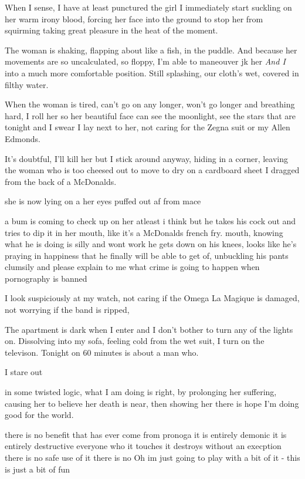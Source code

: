 \documentclass[19pt,openany]{book}
\begin{document}
When I sense, I have
at least punctured the girl
I immediately start
suckling on her warm irony
blood, forcing
her face into the
ground to stop her
from squirming taking great pleasure
in the heat of the moment.

The woman is shaking, flapping
about like a fish, in the puddle.
And  because her movements are so uncalculated,
so floppy, I'm able to maneouver jk
her	\textit{And I} into a much more comfortable
position. Still splashing, our
cloth's wet, covered in filthy
water.

When the woman is tired, can't
go on any longer, won't
go longer and breathing
hard, I roll her so her
beautiful face can see the moonlight,
see the stars that are tonight and I
swear I lay next to her, not caring
for the Zegna suit or my Allen
Edmonds.

It's doubtful, I'll kill her
but I stick around anyway, hiding
in a corner, leaving the woman
who is too cheesed out to move
to dry on a cardboard sheet I
dragged from the back of a McDonalds.

she is now lying on a
her eyes puffed out af
from mace

a bum is coming to check up
on her atleast i think but
he takes his cock out and tries
to dip it in her mouth,
like it's a McDonalds french fry.
mouth, knowing what he is
doing is silly and wont work he gets
down on his knees, looks like he's
praying in happiness that he finally
will be able to get of, unbuckling his
pants clumsily and
please explain to me what
crime is going to happen
when pornography is banned

I look suspiciously
at my watch,
not caring if the Omega
La Magique is damaged, not
worrying if the band is ripped,

The apartment
is dark when I enter and
I don't bother to turn
any of the lights on.
Dissolving into my sofa,
feeling cold from the
wet suit, I turn on
the televison. Tonight
on 60 minutes is about
a man who.

I stare out



in some twisted logic,
what I am doing is right,
by prolonging her suffering,
causing her to believe
her death is near, then showing
her there is hope
I'm doing good for the world.

there is no benefit that has ever come from pronoga
it is entirely demonic
it is entirely destructive
everyone who it touches it destroys
without an execption
there is no safe use of it
there is no Oh im just going
to play with a bit of it -
this is just a bit of fun
\end{document}
